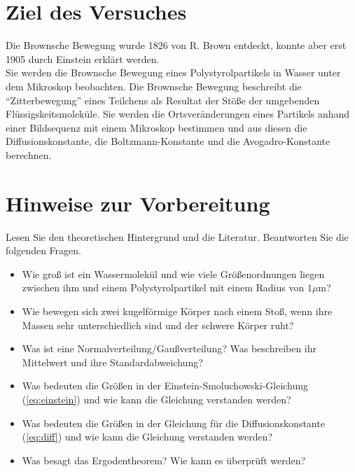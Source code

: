 \section*{Ziel des Versuches}

Die Brownsche Bewegung wurde 1826 von R. Brown entdeckt, konnte aber erst 1905 durch Einstein erklärt werden.\\
Sie werden die Brownsche Bewegung eines Polystyrolpartikels in Wasser unter dem Mikroskop beobachten. Die Brownsche Bewegung beschreibt die ``Zitterbewegung'' eines Teilchens als Resultat der Stöße der umgebenden Flüssigskeitsmoleküle. Sie werden  die Ortsveränderungen eines Partikels anhand einer Bildsequenz mit einem Mikroskop bestimmen und aus diesen die Diffusionskonstante, die Boltzmann-Konstante und die Avogadro-Konstante berechnen.


\section*{Hinweise zur Vorbereitung}
Lesen Sie den theoretischen Hintergrund und die Literatur. Beantworten Sie die folgenden Fragen.

\begin{itemize}
  \item Wie groß ist ein Wassermolekül und wie viele Größenordnungen liegen zwischen ihm und einem Polystyrolpartikel mit einem Radius von $1 \mu$m?
  \item Wie bewegen sich zwei kugelförmige Körper nach einem Stoß, wenn ihre Massen sehr unterschiedlich sind und der schwere Körper ruht?
  \item Was ist eine Normalverteilung/Gaußverteilung? Was beschreiben ihr Mittelwert und ihre Standardabweichung?
  \item Was bedeuten die Größen in der Einstein-Smoluchowski-Gleichung (\ref{eq:einstein}) und wie kann die Gleichung verstanden werden?
  \item Was bedeuten die Größen in der Gleichung für die Diffusionskonstante (\ref{eq:diff}) und wie kann die Gleichung verstanden werden?
  \item Was besagt das Ergodentheorem? Wie kann es überprüft werden?
\end{itemize}

